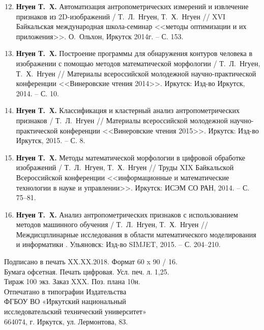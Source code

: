 \begin{enumerate}[label=\arabic*.]\setcounter{enumi}{11}
\item \textbf{Нгуен Т.~Х.} Автоматизация антропометрических измерений и извлечение признаков из 2D-изображений / Т.~Л.~Нгуен, Т.~Х.~Нгуен // XVI Байкальская международная школа-семинар <<методы оптимизации и их приложения>>. О.~Ольхон, Иркутск 2014г. -- С. 153.

\item\textbf{Нгуен Т.~Х.} Построение программы для обнаружения контуров человека в изображении с помощью методов математической морфологии / Т.~Л.~Нгуен, Т.~Х.~Нгуен // Материалы всероссийской молодежной научно-практической конференции <<Винеровские чтения 2014>>. Иркутск: Изд-во Иркутск, 2014. -- С. 10.

\item\textbf{Нгуен Т.~Х.} Классификация и кластерный анализ антропометрических признаков / Т.~Л.~Нгуен // Материалы всероссийской молодежной научно-практической конференции <<Винеровские чтения 2015>>. Иркутск: Изд-во Иркутск, 2015. -- С. 8.

\item\textbf{Нгуен Т.~Х.} Методы математической морфологии в цифровой обработке изображений / Т.~Л.~Нгуен, Т.~Х.~Нгуен // Труды XIX Байкальской Всероссийской конференции <<информационные и математические технологии в науке и управлении>>. Иркутск: ИСЭМ СО РАН, 2014. -- С. 75--81.

\item\textbf{Нгуен Т.~Х.} Анализ антропометрических признаков с использованием методов машинного обучения / Т.~Л.~Нгуен, Т.~Х.~Нгуен // Междисцплинарные исследования в области математического моделирования и информатики . Ульяновск: Изд-во SIMJET, 2015. -- С. 204--210.
\end{enumerate}

\begin{center}
\vspace{0.6cm}
Подписано в печать XX.XX.2018. Формат 60 x 90 / 16.\\
Бумага офсетная. Печать цифровая. Усл. печ. л. 1,25.\\
Тираж 100 экз. Заказ XXX. Поз. плана 10н.\\
\vspace{0.6cm}
Отпечатано в типографии Издательства\\
ФГБОУ ВО «Иркутский национальный\\
исследовательский технический университет»\\
664074, г. Иркутск, ул. Лермонтова, 83.
\end{center}
\thispagestyle{empty}
